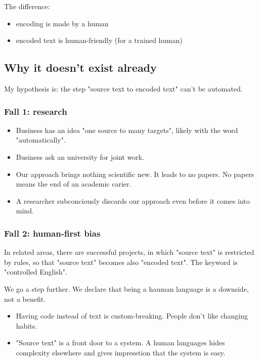 \documentclass{article}
\begin{document}
The difference:
\begin{itemize}
\item encoding is made by a human
\item encoded text is human-friendly (for a trained human)
\end{itemize}

\subsection{Why it doesn't exist already}

My hypothesis is: the step "source text to encoded text" can't be automated.

\subsubsection{Fall 1: research}

\begin{itemize}
\item Business has an idea "one source to many targets", likely with the word "automatically".
\item Business ask an university for joint work.
\item Our approach brings nothing scientific new. It leads to no papers. No papers means the end of an academic carier.
\item A researcher subconciously discards our approach even before it comes into mind.
\end{itemize}

\subsubsection{Fall 2: human-first bias}

In related areas, there are successful projects, in which "source text" is restricted by rules, so that "source text" becomes also "encoded text". The keyword is "controlled English".

We go a step further. We declare that being a hauman language is a downside, not a benefit.

\begin{itemize}
\item Having code instead of text is custom-breaking. People don't like changing habits.
\item "Source text" is a front door to a system. A human languages hides complexity elsewhere and gives impresstion that the system is easy.
\end{itemize}
\end{document}
